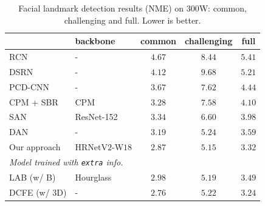 \documentclass[10pt,journal,compsoc]{IEEEtran}
\begin{document}
\renewcommand{\arraystretch}{1.3}
\begin{table}[t]
\setlength{\tabcolsep}{13pt}
\centering
\scriptsize
\caption{Facial landmark detection results (NME) 
on $300$W:
common, challenging and full.
Lower is better.}

\label{table:comparison_300w_fullset}
\begin{tabular}{ l|l|ccc  }
\hline\noalign{\smallskip}
  & backbone &common & challenging & full \\
\hline

\hline
RCN \cite{HonariYVP16} &-& $4.67$ & $8.44$ & $5.41$\\
DSRN \cite{MiaoZLDAH18} &-& $4.12$ & $9.68$ & $5.21$ \\
PCD-CNN \cite{KumarC18} &-& $3.67$ & $7.62$ & $4.44$ \\
CPM + SBR \cite{DongYWW0S18} & CPM & $3.28$ & $7.58$ & $4.10$ \\
SAN \cite{DongYO018} &ResNet-152& $3.34$ & $6.60$ & $3.98$ \\
DAN \cite{KowalskiNT17} &-& $3.19$ & $5.24$ & $3.59$ \\
\hline
Our approach & HRNetV$2$-W$18$ &$\mathbf{2.87}$ & $\mathbf{5.15}$ & $\mathbf{3.32}$\\
\hline

\hline
\multicolumn{3}{l}{
\emph {Model trained with \texttt{extra} info.}}\\
\hline
LAB (w/ B) \cite{Wu0YWC018}& Hourglass & $2.98$ & $5.19$ & $3.49$ \\
DCFE (w/ $3$D) \cite{ValleBVB18}& - &$2.76$ & $5.22$ & $3.24$ \\
\hline
\end{tabular} 
\end{table}
\end{document}
